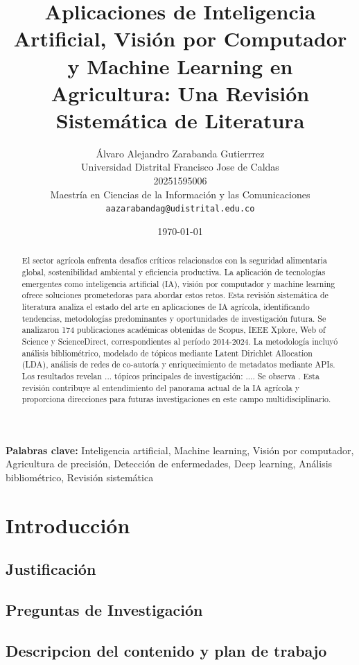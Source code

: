 \documentclass[12pt,a4paper]{article}
\title{\textbf{Aplicaciones de Inteligencia Artificial, Visión por Computador y Machine Learning en Agricultura: Una Revisión Sistemática de Literatura}}
\author{
    Álvaro Alejandro Zarabanda Gutierrrez \\
    \small Universidad Distrital Francisco Jose de Caldas \\
    \small 20251595006 \\
    \small Maestría en Ciencias de la Información y las Comunicaciones \\
    \small \texttt{aazarabandag@udistrital.edu.co}
}
\date{\today}
\begin{document}
\maketitle

\begin{abstract}
El sector agrícola enfrenta desafíos críticos relacionados con la seguridad alimentaria global, sostenibilidad ambiental y eficiencia productiva. La aplicación de tecnologías emergentes como inteligencia artificial (IA), visión por computador y machine learning ofrece soluciones prometedoras para abordar estos retos. Esta revisión sistemática de literatura analiza el estado del arte en aplicaciones de IA agrícola, identificando tendencias, metodologías predominantes y oportunidades de investigación futura. Se analizaron 174 publicaciones académicas obtenidas de Scopus, IEEE Xplore, Web of Science y ScienceDirect, correspondientes al período 2014-2024. La metodología incluyó análisis bibliométrico, modelado de tópicos mediante Latent Dirichlet Allocation (LDA), análisis de redes de co-autoría y enriquecimiento de metadatos mediante APIs. Los resultados revelan ... tópicos principales de investigación: .... Se observa . Esta revisión contribuye al entendimiento del panorama actual de la IA agrícola y proporciona direcciones para futuras investigaciones en este campo multidisciplinario.
\end{abstract}

\textbf{Palabras clave:} Inteligencia artificial, Machine learning, Visión por computador, Agricultura de precisión, Detección de enfermedades, Deep learning, Análisis bibliométrico, Revisión sistemática

\newpage

\section{Introducción}

\subsection{Justificación}

\subsection{Preguntas de Investigación}

\subsection{Descripcion del contenido y plan de trabajo}
\end{document}
